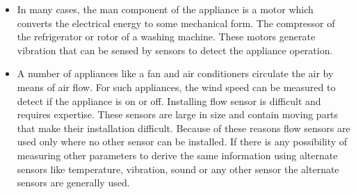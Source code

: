 \begin{itemize}
    \item In many cases, the man component of the appliance is a motor which converts the electrical energy to some mechanical form. The compressor of the refrigerator or rotor of a washing machine. These motors generate vibration that can be sensed by sensors to detect the appliance operation.
    \item A number of appliances like a fan and air conditioners circulate the air by means of air flow. For such appliances, the wind speed can be measured to detect if the appliance is on or off. Installing flow sensor is difficult and requires expertise. These sensors are large in size and contain moving parts that make their installation difficult. Because of these reasons flow sensors are used only where no other sensor can be installed. If there is any possibility of measuring other parameters to derive the same information using alternate sensors like temperature, vibration, sound or any other sensor the alternate sensors are generally used.
\end{itemize}

